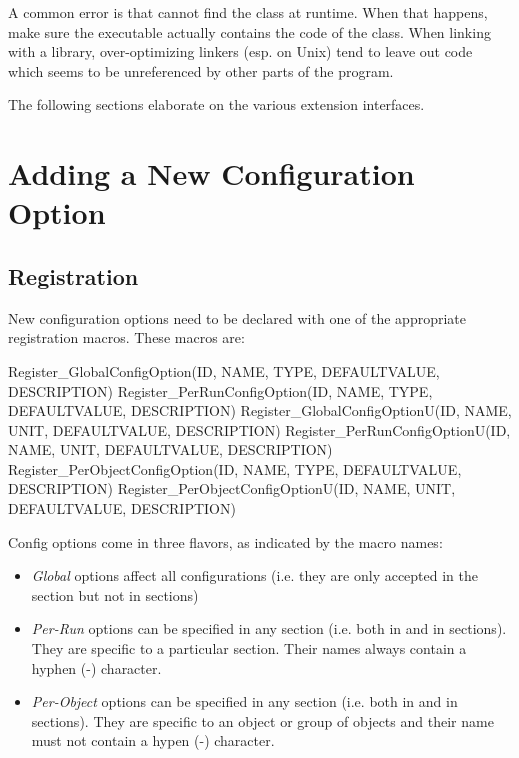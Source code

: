 \begin{note}
A common error is that {\opp} cannot find the class at runtime. When that
happens, make sure the executable actually contains the code of the class.
When linking with a library, over-optimizing linkers (esp. on Unix) tend to
leave out code which seems to be unreferenced by other parts of the
program.
\end{note}

The following sections elaborate on the various extension interfaces.


\section{Adding a New Configuration Option}
\label{sec:plugin-exts:accessing-config}

\subsection{Registration}

New configuration options need to be declared with one of the appropriate
registration macros. These macros are:

\begin{cpp}
Register_GlobalConfigOption(ID, NAME, TYPE, DEFAULTVALUE, DESCRIPTION)
Register_PerRunConfigOption(ID, NAME, TYPE, DEFAULTVALUE, DESCRIPTION)
Register_GlobalConfigOptionU(ID, NAME, UNIT, DEFAULTVALUE, DESCRIPTION)
Register_PerRunConfigOptionU(ID, NAME, UNIT, DEFAULTVALUE, DESCRIPTION)
Register_PerObjectConfigOption(ID, NAME, TYPE, DEFAULTVALUE, DESCRIPTION)
Register_PerObjectConfigOptionU(ID, NAME, UNIT, DEFAULTVALUE, DESCRIPTION)
\end{cpp}

Config options come in three flavors, as indicated by the macro names:

\begin{itemize}
  \item \textit{Global} options affect all configurations (i.e. they are
      only accepted in the \ttt{[General]} section but not in
       sections)
  \item \textit{Per-Run} options can be specified in any section
      (i.e. both in \ttt{[General]} and in  sections).
      They are specific to a particular section. Their names always contain
      a hyphen (-) character.
  \item \textit{Per-Object} options can be specified in any section
      (i.e. both in \ttt{[General]} and in  sections).
      They are specific to an object or group of objects and their name must
      not contain a hypen (-) character.
\end{itemize}

